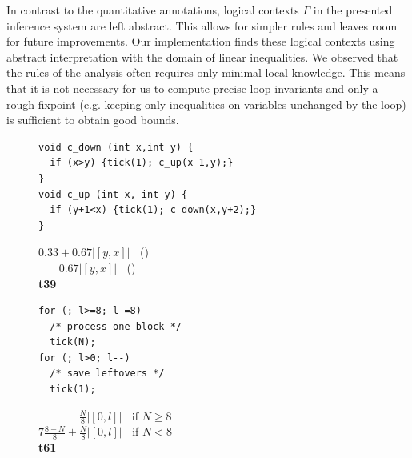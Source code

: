 \documentclass[nocopyrightspace,preprint,pldi]{sigplanconf-pldi15}
\newcommand{\ifshort}[2]{\ifx\fullversion\undefined{#1}\else{#2}\fi}
\begin{document}
In contrast to the quantitative annotations, logical contexts $\Gamma$
in the presented inference system are left abstract.  This allows for
simpler rules and leaves room for future improvements.
Our implementation finds these logical contexts using abstract
interpretation with the domain of linear inequalities.  We observed that
the rules of the analysis often requires only minimal local knowledge.
This means that it is not necessary for us to compute precise loop
invariants and only a rough fixpoint (e.g. keeping only inequalities on
variables unchanged by the loop) is sufficient to obtain good bounds.



\begin{figure}
  \centering
\ifshort{\vspace{-1.8cm}
\hspace{-0.4cm}}{}
  \begin{minipage}[b]{7cm}
    \begin{center}
   \begin{lstlisting}[]
void c_down (int x,int y) {
  if (x>y) {tick(1); c_up(x-1,y);}
}
void c_up (int x, int y) {
  if (y+1<x) {tick(1); c_down(x,y+2);}
}
   \end{lstlisting}
\vspace{-2.5ex}
$0.33 + 0.67 |[y,x]|\;\;$ ()\\
$\;\;\;\;\;\;\,0.67 |[y,x]|\;\;$ ()
\\[.4\baselineskip]
      {\bf t39}
    \end{center}
  \end{minipage}
%
\hfill
%
  \begin{minipage}[b]{5cm}
    \begin{center}
   \begin{lstlisting}
for (; l>=8; l-=8)
  /* process one block */
  tick(N);
for (; l>0; l--)
  /* save leftovers */
  tick(1);
   \end{lstlisting}
\vspace{-2.5ex}
$\;\;\;\;\;\;\;\;\;\;\;\;\;\frac{N}{8} |[0,l]|\;\;$ if $N \geq 8$\\
$7\frac{8-N}{8} + \frac{N}{8}|[0,l]|\;\;$ if $N < 8$
\\[.4\baselineskip]
      {\bf t61}
    \end{center}
  \end{minipage}
%
\hfill
%
  \begin{minipage}[b]{5.5cm}
    \begin{center}
   \begin{lstlisting}



\end{lstlisting}
\end{center}
\end{minipage}
\end{figure}
\end{document}
